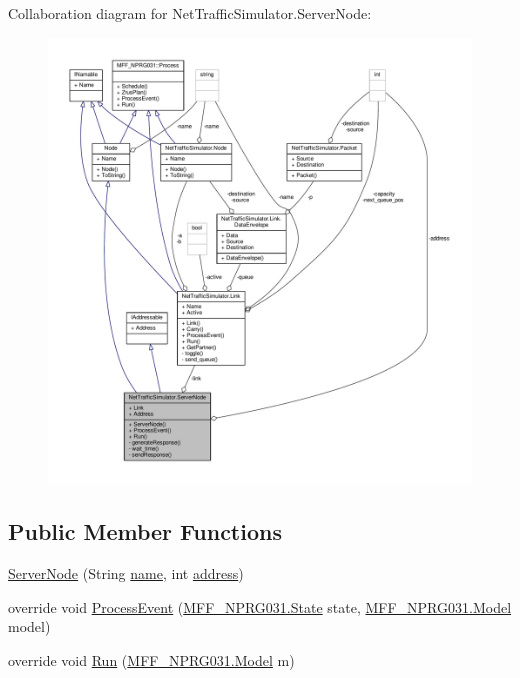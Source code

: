 Collaboration diagram for Net\-Traffic\-Simulator.\-Server\-Node\-:\nopagebreak
\begin{figure}[H]
\begin{center}
\leavevmode
\includegraphics[width=350pt]{classNetTrafficSimulator_1_1ServerNode__coll__graph}
\end{center}
\end{figure}
\subsection*{Public Member Functions}
\begin{DoxyCompactItemize}
\item 
\hyperlink{classNetTrafficSimulator_1_1ServerNode_a0773c3d7230848f02282f217fcead9c3}{Server\-Node} (String \hyperlink{classNetTrafficSimulator_1_1Node_a679d5b6cca77c0cdb46cc98c347d4747}{name}, int \hyperlink{classNetTrafficSimulator_1_1ServerNode_a8be317d1e315710190755e4560fea3ef}{address})
\item 
override void \hyperlink{classNetTrafficSimulator_1_1ServerNode_ab309ebda509474d7a7f14b60955e5f98}{Process\-Event} (\hyperlink{classMFF__NPRG031_1_1State}{M\-F\-F\-\_\-\-N\-P\-R\-G031.\-State} state, \hyperlink{classMFF__NPRG031_1_1Model}{M\-F\-F\-\_\-\-N\-P\-R\-G031.\-Model} model)
\item 
override void \hyperlink{classNetTrafficSimulator_1_1ServerNode_aec78a48eea4006df1b4bce59ef17fbf7}{Run} (\hyperlink{classMFF__NPRG031_1_1Model}{M\-F\-F\-\_\-\-N\-P\-R\-G031.\-Model} m)
\end{DoxyCompactItemize}
